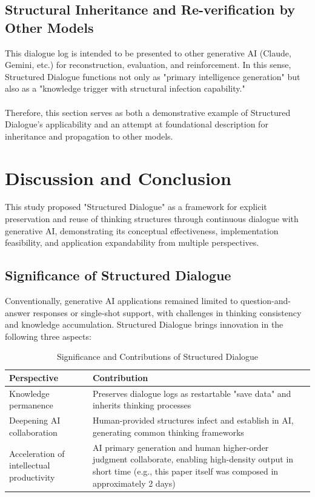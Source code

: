 \documentclass[11pt]{article}
\begin{document}
\subsection{Structural Inheritance and Re-verification by Other Models}
This dialogue log is intended to be presented to other generative AI (Claude, Gemini, etc.) for reconstruction, evaluation, and reinforcement. In this sense, Structured Dialogue functions not only as "primary intelligence generation" but also as a "knowledge trigger with structural infection capability." \\
\\
Therefore, this section serves as both a demonstrative example of Structured Dialogue's applicability and an attempt at foundational description for inheritance and propagation to other models.
\section{Discussion and Conclusion}
This study proposed "Structured Dialogue" as a framework for explicit preservation and reuse of thinking structures through continuous dialogue with generative AI, demonstrating its conceptual effectiveness, implementation feasibility, and application expandability from multiple perspectives.
\subsection{Significance of Structured Dialogue}
Conventionally, generative AI applications remained limited to question-and-answer responses or single-shot support, with challenges in thinking consistency and knowledge accumulation. Structured Dialogue brings innovation in the following three aspects:

\begin{table}[htbp]
\centering
\caption{Significance and Contributions of Structured Dialogue}
\begin{tabular}{p{4cm}|p{8cm}}
\hline
\textbf{Perspective} & \textbf{Contribution} \\
\hline
Knowledge permanence & Preserves dialogue logs as restartable "save data" and inherits thinking processes \\
\hline
Deepening AI collaboration & Human-provided structures infect and establish in AI, generating common thinking frameworks \\
\hline
Acceleration of intellectual productivity & AI primary generation and human higher-order judgment collaborate, enabling high-density output in short time (e.g., this paper itself was composed in approximately 2 days) \\
\hline
\end{tabular}
\label{tab:significance}
\end{table}
\end{document}
